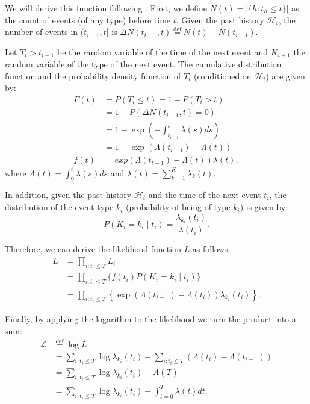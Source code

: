    We will derive this function following . First, we define $N(t) = |\{h : t_h \leq t\}|$ as the count of events (of any type) before time $t$. Given the past history $\mathcal{H}_i$, the number of events in $(t_{i-1}, t]$ is $\Delta N (t_{i-1}, t) \overset{\text{def}}{=} N(t) - N(t_{i-1})$.

    Let $T_i > t_{i-1}$ be the random variable of the time of the next event and $K_{i+1}$ the random variable of the type of the next event. The cumulative distribution function and the probability density function of $T_i$ (conditioned on $\mathcal{H}_i$) are given by:
    \begin{align}
        F(t) &= P(T_i \leq t) = 1 - P(T_i > t) \\
        &= 1 - P(\Delta N (t_{i-1}, t) = 0) \\
        &= 1 - \exp \left( - \int_{t_{i-1}}^{t} \lambda(s)ds \right) \\
        &= 1 - \exp (\Lambda(t_{i-1}) - \Lambda(t)) \label{eq:cdf_4} \\
        f(t) &= exp(\Lambda(t_{t-1})-\Lambda(t))\lambda(t),
    \end{align}
    where $\Lambda(t) = \int_{0}^{t} \lambda(s)ds$ and $\lambda(t) = \sum_{k=1}^K \lambda_k(t)$.

    In addition, given the past history $\mathcal{H}_i$ and the time of the next event $t_i$, the distribution of the event type $k_i$ (probability of being of type $k_i$) is given by:
    \begin{equation}
        P(K_i = k_i \mid t_i) = \frac{\lambda_{k_i}(t_i)}{\lambda(t_i)}. \label{eq:cond_type_prob}
    \end{equation}

    Therefore, we can derive the likelihood function $L$ as follows:
    \begin{align}
        L &= \prod_{i:t_i \leq T} L_i \\
        &= \prod_{i:t_i \leq T} \{ f(t_i) P(K_i = k_i \mid t_i) \} \label{eq:likelihood_prod_1} \\
        &= \prod_{i:t_i \leq T} \left\{ \exp (\Lambda(t_{i-1}) - \Lambda(t_i)) \lambda_{k_i}(t_i) \right\}. \label{eq:likelihood_prod_3}
    \end{align}

    Finally, by applying the logarithm to the likelihood we turn the product into a sum:
    \begin{align}
        \mathcal{L} &\overset{\text{def}}{=} \log L \\
        &= \sum_{i:t_i \leq T} \log\lambda_{k_i}(t_i)-\sum_{i:t_i \leq T}(\Lambda (t_i)-\Lambda(t_{i-1})) \\
        &= \sum_{i:t_i \leq T} \log \lambda_{k_i}(t_i) - \Lambda(T) \label{eq:log_likelihood_final_2} \\
        &= \sum_{i:t_i \leq T} \log \lambda_{k_i}(t_i) - \int_{t=0}^{T} \lambda(t)dt. \label{eq:log_likelihood_final_3}
    \end{align}

